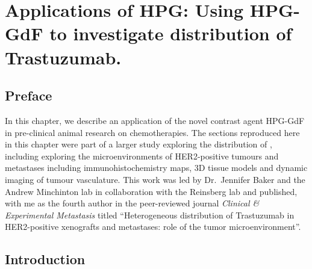 

\chapter{Applications of HPG: Using \acs{HPG-GdF} to investigate distribution of Trastuzumab.}
\label{ch:HPG2}

\section{Preface}
In this chapter, we describe an application of the novel contrast agent \acs{HPG-GdF} in pre-clinical animal research on chemotherapies.
The sections reproduced here in this chapter were part of a larger study exploring the distribution of , including exploring the microenvironments of \acs{HER2}-positive tumours and metastases including immunohistochemistry maps, 3D tissue models and dynamic imaging of tumour vasculature.
This work was led by Dr.\ Jennifer Baker and the Andrew Minchinton lab in collaboration with the Reinsberg lab and published, with me as the fourth author in  the peer-reviewed journal \emph{Clinical \& Experimental Metastasis}  titled ``Heterogeneous distribution of Trastuzumab in \acs{HER2}-positive xenografts and metastases: role of the tumor microenvironment''.

\section{Introduction}

